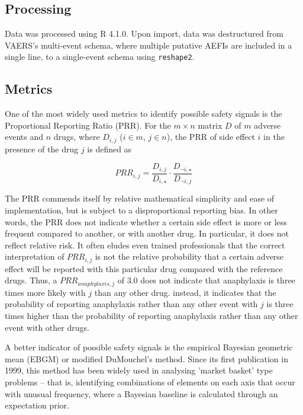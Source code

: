 \documentclass[12pt]{article}
\begin{document}

\subsection{Processing} %
\label{sub:processing}


Data was processed using R 4.1.0\cite{rstats}. Upon import, data was destructured from VAERS's multi-event schema, where multiple putative AEFIs are included in a single line, to a single-event schema using \texttt{reshape2}.\cite{wickham2012reshape2} 


\subsection{Metrics} %
\label{sub:metrics}

One of the most widely used metrics to identify possible safety signals is the Proportional Reporting Ratio (PRR).\cite{evans2001use} For the $m \times n$ matrix $D$ of $m$ adverse events and $n$ drugs, where $D_{i,j}$ ($i \in m$, $j \in n$), the PRR of side effect $i$ in the presence of the drug $j$ is defined as

$$
   PRR_{i,j} = \frac{D_{i,j}}{D_{i,\star}} \cdot \frac{D_{\neg i, \star}}{D_{\neg i, j}}
$$

The PRR commends itself by relative mathematical simplicity and ease of implementation, but is subject to a disproportional reporting bias. In other words, the PRR does not indicate whether a certain side effect is more or less frequent compared to another, or with another drug. In particular, it does not reflect relative risk. It often eludes even trained professionals that the correct interpretation of $PRR_{i,j}$ is not the relative probability that a certain adverse effect will be reported with this particular drug compared with the reference drugs. Thus, a $PRR_{anaphylaxis,j}$ of 3.0 does not indicate that anaphylaxis is three times more likely with $j$ than any other drug. instead, it indicates that the probability of reporting anaphylaxis rather than any other event with $j$ is three times higher than the probability of reporting anaphylaxis rather than any other event with other drugs.\cite{moore2003biases}

A better indicator of possible safety signals is the empirical Bayesian geometric mean (EBGM) or modified DuMouchel's method.\cite{dumouchel1999bayesian} Since its first publication in 1999, this method has been widely used in analysing 'market basket' type problems – that is, identifying combinations of elements on each axis that occur with unusual frequency, where a Bayesian baseline is calculated through an expectation prior.\cite{almenoff2003disproportionality,harpaz2013empirical,lee2020safety} 
\end{document}
